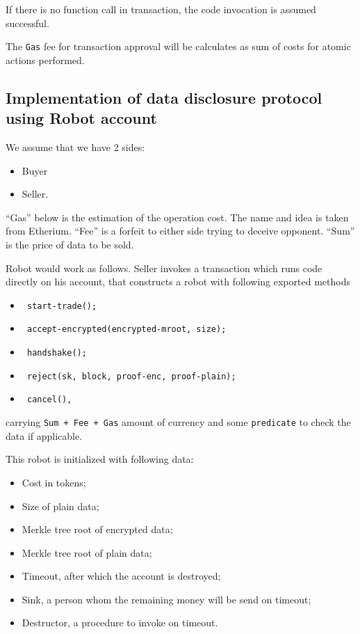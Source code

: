 If there is no function call in transaction, the code invocation is assumed successful.

The \verb|Gas| fee for transaction approval will be calculates as sum of costs for atomic actions performed.

\subsection{Implementation of data disclosure protocol using Robot account}

We assume that we have 2 sides:
\begin{itemize}
  \item Buyer
  \item Seller.
\end{itemize}

``Gas'' below is the estimation of the operation cost. The name and idea is taken from Etherium.
``Fee'' is a forfeit to either side trying to deceive opponent.
``Sum'' is the price of data to be sold.

Robot would work as follows. Seller invokes a transaction which runs code directly on his account, that constructs a robot with following exported methods

\begin{itemize}
  \item \begin{verbatim} start-trade(); \end{verbatim}
  \item \begin{verbatim} accept-encrypted(encrypted-mroot, size); \end{verbatim}
  \item \begin{verbatim} handshake(); \end{verbatim}
  \item \begin{verbatim} reject(sk, block, proof-enc, proof-plain); \end{verbatim}
  \item \begin{verbatim} cancel(), \end{verbatim}
\end{itemize}
carrying \verb|Sum + Fee + Gas| amount of currency and some \verb|predicate| to check the data if applicable.

This robot is initialized with following data:
\begin{itemize}
  \item Cost in tokens;
  \item Size of plain data;
  \item Merkle tree root of encrypted data;
  \item Merkle tree root of plain data;
  \item Timeout, after which the account is destroyed;
  \item Sink, a person whom the remaining money will be send on timeout;
  \item Destructor, a procedure to invoke on timeout.
\end{itemize}

